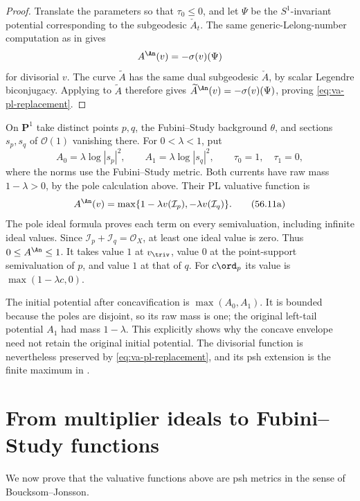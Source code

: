 \begin{proof}
Translate the parameters so that $\tau_0\leq0$, and let $\Psi$ be the
$S^1$-invariant potential corresponding to the subgeodesic
$\check A_t$.  The same generic-Lelong-number computation as in
 gives
\[
 A^{\An}(v)=-\sigma(v)(\Psi)
\]
for divisorial $v$.  The curve $\widetilde A$ has the same dual
subgeodesic $\check A$, by scalar Legendre biconjugacy.  Applying
 to $\widetilde A$ therefore gives
$\widetilde A^{\An}(v)=-\sigma(v)(\Psi)$, proving
\eqref{eq:va-pl-replacement}.
\end{proof}

\begin{example}
\label{ex:va-pl-two-poles}
On $\mathbf P^1$ take distinct points $p,q$, the Fubini--Study
background $\theta$, and sections $s_p,s_q$ of $\mathcal O(1)$
vanishing there. For $0<\lambda<1$, put
\[
 A_0=\lambda\log|s_p|^2,\qquad
 A_1=\lambda\log|s_q|^2,\qquad
 \tau_0=1,\quad\tau_1=0,
\]
where the norms use the Fubini--Study metric. Both currents have raw
mass $1-\lambda>0$, by the pole calculation above. Their PL
valuative function is
\[
 A^{\An}(v)=\max\{1-\lambda v(\mathcal I_p),
                         -\lambda v(\mathcal I_q)\}.
\tag{56.11a}\label{eq:va-pl-two-poles}
\]
The pole ideal formula proves each term on every semivaluation,
including infinite ideal values. Since
$\mathcal I_p+\mathcal I_q=\mathcal O_X$, at least one ideal value
is zero. Thus $0\leq A^{\An}\leq1$. It takes value $1$ at
$v_{\triv}$, value $0$ at the point-support semivaluation of $p$,
and value $1$ at that of $q$. For $c\ord_p$ its value is
$\max(1-\lambda c,0)$.

The initial potential after concavification is
$\max(A_0,A_1)$. It is bounded because the poles are disjoint, so
its raw mass is one; the original left-tail potential $A_1$ had mass
$1-\lambda$. This explicitly shows why the concave envelope need
not retain the original initial potential. The divisorial function
is nevertheless preserved by \eqref{eq:va-pl-replacement}, and its
psh extension is the finite maximum in .
\end{example}

\section{From multiplier ideals to Fubini--Study functions}
\label{sec:va-fs}

We now prove that the valuative functions above are psh metrics in the sense
of Boucksom--Jonsson.

